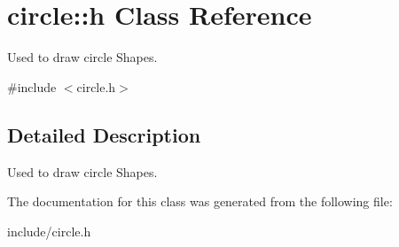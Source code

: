 \hypertarget{classcircle_1_1h}{}\section{circle\+:\+:h Class Reference}
\label{classcircle_1_1h}


Used to draw circle Shapes.  




{\ttfamily \#include $<$circle.\+h$>$}



\subsection{Detailed Description}
Used to draw circle Shapes. 

The documentation for this class was generated from the following file\+:\begin{DoxyCompactItemize}
\item 
include/circle.\+h\end{DoxyCompactItemize}

